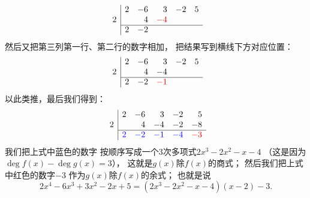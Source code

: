 \begin{example}
\begin{solution}
\[	\begin{array}{r|*5r}
		& 2 & -6 & 3 & -2 & 5 \\
		2 && 4 & {\color{red}-4} \\ \cline{2-6}
		& 2 & -2
	\end{array}
\]
然后又把第三列第一行、第二行的数字相加，
把结果写到横线下方对应位置：\[
	\begin{array}{r|*5r}
		& 2 & -6 & 3 & -2 & 5 \\
		2 && 4 & -4 \\ \cline{2-6}
		& 2 & -2 & {\color{red}-1}
	\end{array}
\]
以此类推，最后我们得到：\[
	\begin{array}{r|*5r}
		& 2 & -6 & 3 & -2 & 5 \\
		2 && 4 & -4 & -2 & -8 \\ \cline{2-6}
		& \color{blue}2 & \color{blue}-2 & \color{blue}-1 & \color{blue}-4
		& {\color{red}-3}
	\end{array}
\]
我们把上式中蓝色的数字
按顺序写成一个3次多项式\(2x^3-2x^2-x-4\)
（这是因为\(\deg f(x)-\deg g(x)=3\)），
这就是\(g(x)\)除\(f(x)\)的商式；
然后我们把上式中红色的数字\(-3\)
作为\(g(x)\)除\(f(x)\)的余式；
也就是说\[
	2x^4-6x^3+3x^2-2x+5
	=(2x^3-2x^2-x-4)(x-2)-3.
\]
\end{solution}
\end{example}


